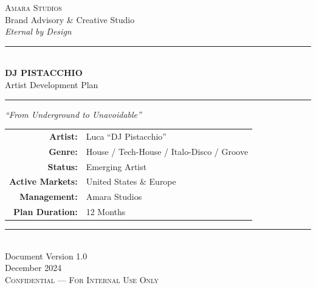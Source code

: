 \documentclass[11pt,a4paper]{article}
\begin{document}
\begin{titlepage}
    \centering
    \vspace*{1.5cm}
    
    {\huge\textcolor{amaraprimary}{\textsc{Amara Studios}}}\\[0.4cm]
    {\small\textcolor{amaradark}{Brand Advisory \& Creative Studio}}\\[0.2cm]
    {\small\textit{\textcolor{amarasecondary}{Eternal by Design}}}
    
    \vspace{2.5cm}
    
    {\textcolor{amaraprimary}{\rule{\textwidth}{2pt}}}\\[0.6cm]
    {\Huge\bfseries\textcolor{amaraprimary}{DJ PISTACCHIO}}\\[0.4cm]
    {\LARGE\textcolor{amaradark}{Artist Development Plan}}\\[0.6cm]
    {\textcolor{amaraprimary}{\rule{\textwidth}{2pt}}}
    
    \vspace{1.2cm}
    
    {\large\textit{\textcolor{amaragray}{``From Underground to Unavoidable''}}}
    
    \vspace{2cm}
    
    \begin{tabular}{rl}
        \textcolor{amaraprimary}{\textbf{Artist:}} & Luca ``DJ Pistacchio'' \\[0.4cm]
        \textcolor{amaraprimary}{\textbf{Genre:}} & House / Tech-House / Italo-Disco / Groove \\[0.4cm]
        \textcolor{amaraprimary}{\textbf{Status:}} & Emerging Artist \\[0.4cm]
        \textcolor{amaraprimary}{\textbf{Active Markets:}} & United States \& Europe \\[0.4cm]
        \textcolor{amaraprimary}{\textbf{Management:}} & Amara Studios \\[0.4cm]
        \textcolor{amaraprimary}{\textbf{Plan Duration:}} & 12 Months \\[0.4cm]
    \end{tabular}
    
    \vfill
    
    {\textcolor{amaralightgray}{\rule{0.5\textwidth}{1pt}}}\\[0.5cm]
    {\small\textcolor{amaragray}{Document Version 1.0}}\\
    {\small\textcolor{amaragray}{December 2024}}\\[0.4cm]
    {\footnotesize\textcolor{amaraprimary}{\textsc{Confidential --- For Internal Use Only}}}
    
\end{titlepage}
\end{document}
